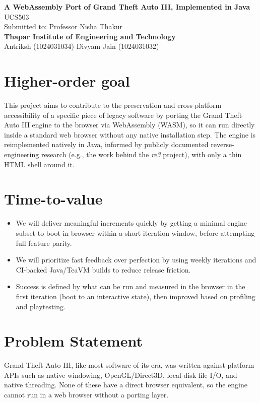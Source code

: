 \documentclass[11pt]{article}
\begin{document}
\begin{center}
{\LARGE\bfseries A WebAssembly Port of Grand Theft Auto III, Implemented in Java}\\[0.6em]
UCS503\\
Submitted to: Professor Nisha Thakur\\
\textbf{Thapar Institute of Engineering and Technology}\\[1em]
Antriksh (1024031034)
\qquad\qquad
Divyam Jain (1024031032)
\end{center}

\section{Higher-order goal}
This project aims to contribute to the preservation and cross-platform accessibility of a specific piece of legacy software by porting the Grand Theft Auto III engine to the browser via WebAssembly (WASM), so it can run directly inside a standard web browser without any native installation step. The engine is reimplemented natively in Java, informed by publicly documented reverse-engineering research (e.g., the work behind the \emph{re3} project), with only a thin HTML shell around it.

\section{Time-to-value}
\begin{itemize}[itemsep=2pt]
  \item We will deliver meaningful increments quickly by getting a minimal engine subset to boot in-browser within a short iteration window, before attempting full feature parity.
  \item We will prioritize fast feedback over perfection by using weekly iterations and CI-backed Java/TeaVM builds to reduce release friction.
  \item Success is defined by what can be run and measured in the browser in the first iteration (boot to an interactive state), then improved based on profiling and playtesting.
\end{itemize}

\section{Problem Statement}
Grand Theft Auto III, like most software of its era, was written against platform APIs such as native windowing, OpenGL/Direct3D, local-disk file I/O, and native threading. None of these have a direct browser equivalent, so the engine cannot run in a web browser without a porting layer.
\end{document}
